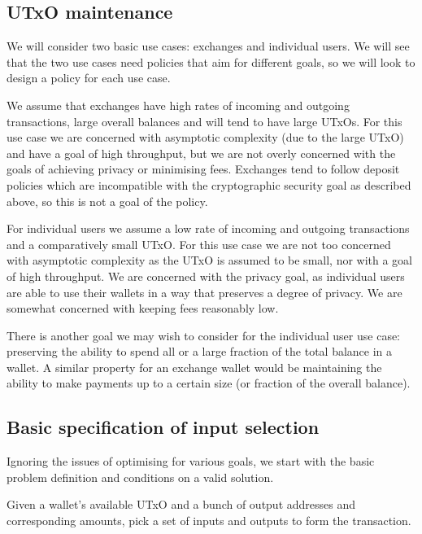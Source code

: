 \documentclass{article}
\begin{document}
\subsection{UTxO maintenance}

We will consider two basic use cases: exchanges and individual users. We will
see that the two use cases need policies that aim for different goals, so we
will look to design a policy for each use case.

We assume that exchanges have high rates of incoming and outgoing transactions,
large overall balances and will tend to have large UTxOs. For this use case we
are concerned with asymptotic complexity (due to the large UTxO) and have a
goal of high throughput, but we are not overly concerned with the goals of
achieving privacy or minimising fees. Exchanges tend to follow deposit policies
which are incompatible with the cryptographic security goal as described above,
so this is not a goal of the policy.

For individual users we assume a low rate of incoming and outgoing transactions
and a comparatively small UTxO. For this use case we are not too concerned with
asymptotic complexity as the UTxO is assumed to be small, nor with a goal of
high throughput. We are concerned with the privacy goal, as individual users
are able to use their wallets in a way that preserves a degree of privacy. We
are somewhat concerned with keeping fees reasonably low.

There is another goal we may wish to consider for the individual user use case:
preserving the ability to spend all or a large fraction of the total balance in
a wallet. A similar property for an exchange wallet would be maintaining the
ability to make payments up to a certain size (or fraction of the overall
balance).

\subsection{Basic specification of input selection}

Ignoring the issues of optimising for various goals, we start with the basic
problem definition and conditions on a valid solution.

Given a wallet's available UTxO and a bunch of output addresses and corresponding
amounts, pick a set of inputs and outputs to form the transaction.
\end{document}
